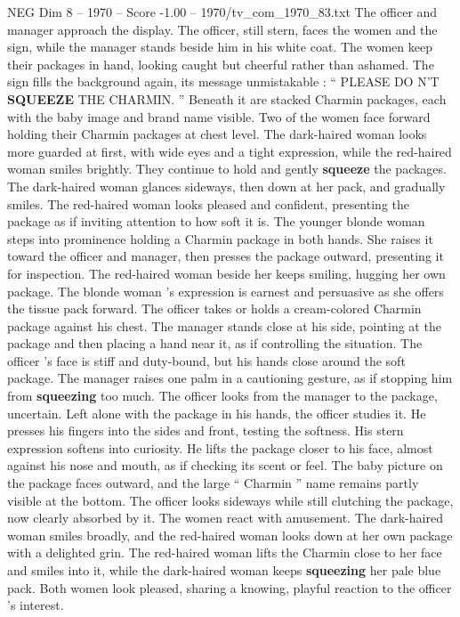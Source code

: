 \begin{textsample}{NEG Dim 8 – 1970 – Score -1.00 – 1970/tv\_com\_1970\_83.txt}
The officer and manager approach the display.
The officer, still stern, faces the women and the sign, while the manager stands beside him in his white coat.
The women keep their packages in hand, looking caught but cheerful rather than ashamed.
The sign fills the background again, its message unmistakable : “ PLEASE DO N’T \textbf{SQUEEZE} THE CHARMIN. ” Beneath it are stacked Charmin packages, each with the baby image and brand name visible.
Two of the women face forward holding their Charmin packages at chest level.
The dark-haired woman looks more guarded at first, with wide eyes and a tight expression, while the red-haired woman smiles brightly.
They continue to hold and gently \textbf{squeeze} the packages.
The dark-haired woman glances sideways, then down at her pack, and gradually smiles.
The red-haired woman looks pleased and confident, presenting the package as if inviting attention to how soft it is.
The younger blonde woman steps into prominence holding a Charmin package in both hands.
She raises it toward the officer and manager, then presses the package outward, presenting it for inspection.
The red-haired woman beside her keeps smiling, hugging her own package.
The blonde woman ’s expression is earnest and persuasive as she offers the tissue pack forward.
The officer takes or holds a cream-colored Charmin package against his chest.
The manager stands close at his side, pointing at the package and then placing a hand near it, as if controlling the situation.
The officer ’s face is stiff and duty-bound, but his hands close around the soft package.
The manager raises one palm in a cautioning gesture, as if stopping him from \textbf{squeezing} too much.
The officer looks from the manager to the package, uncertain.
Left alone with the package in his hands, the officer studies it.
He presses his fingers into the sides and front, testing the softness.
His stern expression softens into curiosity.
He lifts the package closer to his face, almost against his nose and mouth, as if checking its scent or feel.
The baby picture on the package faces outward, and the large “ Charmin ” name remains partly visible at the bottom.
The officer looks sideways while still clutching the package, now clearly absorbed by it.
The women react with amusement.
The dark-haired woman smiles broadly, and the red-haired woman looks down at her own package with a delighted grin.
The red-haired woman lifts the Charmin close to her face and smiles into it, while the dark-haired woman keeps \textbf{squeezing} her pale blue pack.
Both women look pleased, sharing a knowing, playful reaction to the officer ’s interest.

\end{textsample}

